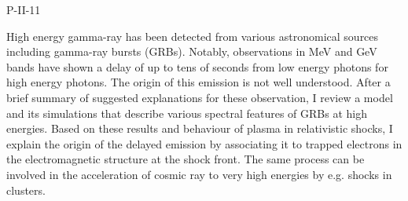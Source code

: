 P-II-11


\bigskip



\bigskip

\noindent High energy gamma-ray has been detected from various astronomical sources including gamma-ray bursts (GRBs). Notably, observations in MeV and GeV bands have shown a delay of up to tens of seconds from low energy photons for high energy photons. The origin of this emission is not well understood. After a brief summary of suggested explanations for these observation, I review a model and its simulations that describe various spectral features of GRBs at high energies. Based on these results and behaviour of plasma in relativistic shocks, I explain the origin of the delayed emission by associating it to trapped electrons in the electromagnetic structure at the shock front. The same process can be involved in the acceleration of cosmic ray to very high energies by e.g. shocks in clusters.
